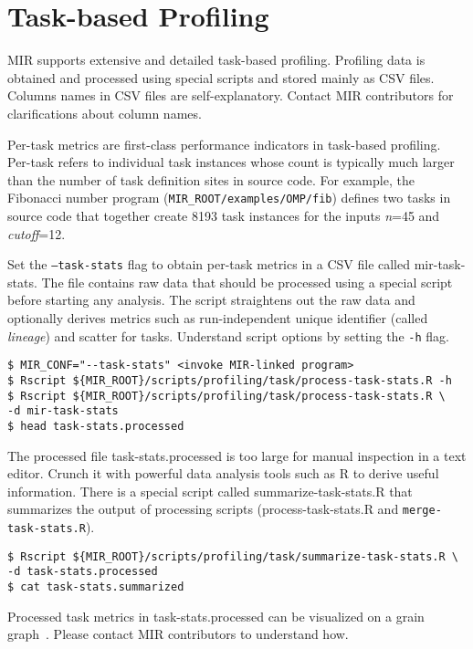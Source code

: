 \documentclass[11pt,a4paper]{article}
\begin{document}
\section{Task-based Profiling}\label{sec:task-based-profiling}

MIR supports extensive and detailed task-based profiling. Profiling data is obtained and processed using special scripts and stored mainly as CSV files. Columns names in CSV files are self-explanatory. Contact MIR contributors for clarifications about column names.

Per-task metrics are first-class performance indicators in task-based profiling.
Per-task refers to individual task instances whose count is typically much larger than the number of task definition sites in source code. For example, the Fibonacci number program (\texttt{MIR\_ROOT/examples/OMP/fib}) defines two tasks in source code that together create 8193 task instances for the inputs \textit{n}=45 and \textit{cutoff}=12.

Set the \texttt{--task-stats} flag to obtain per-task metrics in a CSV file called \textsf{mir-task-stats}. The file contains raw data that should be processed using a special script before starting any analysis. The script straightens out the raw data and optionally derives metrics such as run-independent unique identifier (called \textit{lineage}) and scatter for tasks. Understand script options by setting the \texttt{-h} flag.

\begin{lstlisting}[style=MyInputStyle]
$ MIR_CONF="--task-stats" <invoke MIR-linked program>
$ Rscript ${MIR_ROOT}/scripts/profiling/task/process-task-stats.R -h
$ Rscript ${MIR_ROOT}/scripts/profiling/task/process-task-stats.R \
-d mir-task-stats
$ head task-stats.processed
\end{lstlisting}

The processed file \textsf{task-stats.processed} is too large for manual inspection in a text editor. Crunch it with powerful data analysis tools such as R to derive useful information. There is a special script called \textsf{summarize-task-stats.R} that summarizes the output of processing scripts (\textsf{process-task-stats.R} and \texttt{merge-task-stats.R}).
\begin{lstlisting}[style=MyInputStyle]
$ Rscript ${MIR_ROOT}/scripts/profiling/task/summarize-task-stats.R \
-d task-stats.processed
$ cat task-stats.summarized
\end{lstlisting}

Processed task metrics in \textsf{task-stats.processed} can be visualized on a grain graph~\cite{muddukrishna2015grain}. Please contact MIR contributors to understand how.
\end{document}
